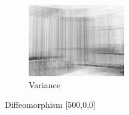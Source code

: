 \documentclass[10pt]{report}
\begin{document}
\begin{figure}[H]
\begin{subfigure}[b]{0.3\textwidth}
                \includegraphics[width=\textwidth]{D0-variance-h.png}
                \caption{Variance}
                \label{fig:v}
        \end{subfigure}
        \caption{Diffeomorphism [500,0,0]}\label{fig:D0}
\end{figure}
\end{document}
